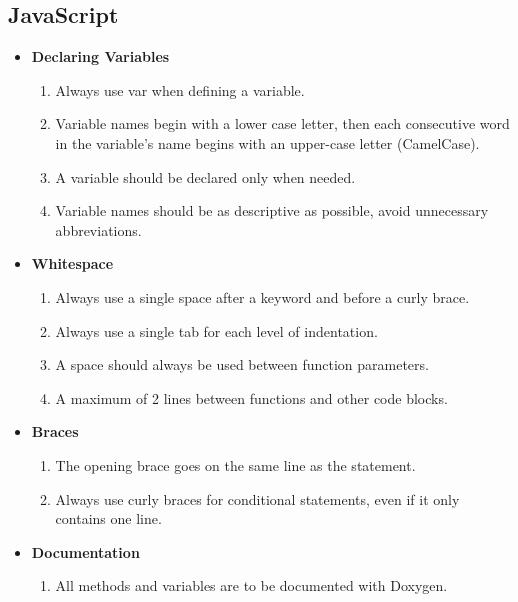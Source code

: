 \documentclass[11pt,a4paper]{article}
\begin{document}
\subsection{JavaScript}
\begin{itemize}
\item \textbf{Declaring Variables}
	\begin{enumerate}
	\item Always use var when defining a variable.
    \item Variable names begin with a lower case letter, then each consecutive word in the variable's name begins with an upper-case letter (CamelCase).
    \item A variable should be declared only when needed.
   	\item Variable names should be as descriptive as possible, avoid unnecessary abbreviations.
	\end{enumerate}
\item \textbf{Whitespace}
	\begin{enumerate}
	\item Always use a single space after a keyword and before a curly brace.
    \item Always use a single tab for each level of indentation.
    \item A space should always be used between function parameters.
    \item A maximum of 2 lines between functions and other code blocks.
	\end{enumerate}
\item \textbf{Braces}
	\begin{enumerate}
	\item The opening brace goes on the same line as the statement.
	\item Always use curly braces for conditional statements, even if it only contains one line.
	\end{enumerate}
\item \textbf{Documentation}
	\begin{enumerate}
	\item All methods and variables are to be documented with Doxygen.
	\end{enumerate}
\end{itemize}
\end{document}
